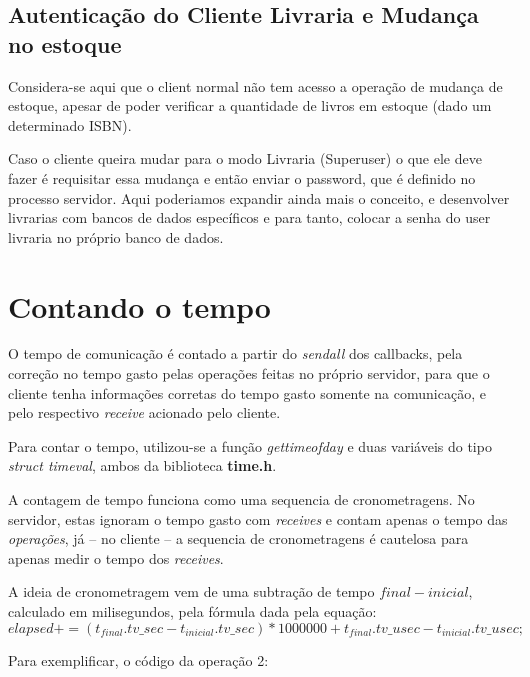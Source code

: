 \documentclass[10pt,a4paper]{report}
\begin{document}
\newpage
\subsection{Autenticação do Cliente Livraria e Mudança no estoque}


Considera-se aqui que o client normal não tem acesso a operação de mudança de estoque, apesar de poder verificar a quantidade de livros em estoque (dado um determinado ISBN).

	Caso o cliente queira mudar para o modo Livraria (Superuser) o que ele deve fazer é requisitar essa mudança e então enviar o password, que é definido no processo servidor. Aqui poderiamos expandir ainda mais o conceito, e desenvolver livrarias com bancos de dados específicos e para tanto, colocar a senha do user livraria no próprio banco de dados.

\section{Contando o tempo}


O tempo de comunicação é contado a partir do \textit{sendall} dos callbacks, pela correção no tempo gasto pelas operações feitas no próprio servidor, para que o cliente tenha informações corretas do tempo gasto somente na comunicação, e pelo respectivo \textit{receive} acionado pelo cliente.

Para contar o tempo, utilizou-se a função \textit{gettimeofday} e duas variáveis do tipo \textit{struct timeval}, ambos da biblioteca \textbf{time.h}.

A contagem de tempo funciona como uma sequencia de cronometragens. No servidor, estas ignoram o tempo gasto com \emph{receives} e contam apenas o tempo das \emph{operações}, já -- no cliente -- a sequencia de cronometragens é cautelosa para apenas medir o tempo dos \emph{receives}.

A ideia de cronometragem vem de uma subtração de tempo $final - inicial$, calculado em milisegundos, pela fórmula dada pela equação:
\begin{equation}
elapsed += (t_{final}.tv\_sec-t_{inicial}.tv\_sec)*1000000 + t_{final}.tv\_usec-t_{inicial}.tv\_usec;
\end{equation}

Para exemplificar, o código da operação 2:
\end{document}
